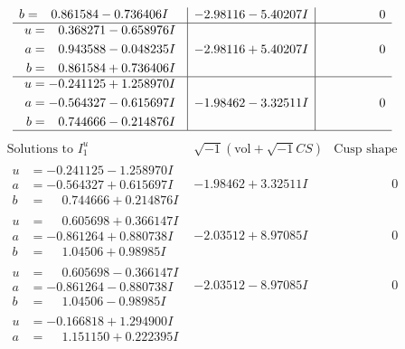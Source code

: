 \documentclass[1p]{elsarticle_modified}
\theoremstyle{definition}
\newcommand{\I}{\sqrt{-1}}
\begin{document}
$$\begin{array}{c|c|c}
\begin{aligned}
b &= \phantom{-}0.861584 - 0.736406 I\end{aligned}
 & -2.98116 - 5.40207 I & \phantom{-0.000000 } 0 \\ \hline\begin{aligned}
u &= \phantom{-}0.368271 - 0.658976 I \\
a &= \phantom{-}0.943588 - 0.048235 I \\
b &= \phantom{-}0.861584 + 0.736406 I\end{aligned}
 & -2.98116 + 5.40207 I & \phantom{-0.000000 } 0 \\ \hline\begin{aligned}
u &= -0.241125 + 1.258970 I \\
a &= -0.564327 - 0.615697 I \\
b &= \phantom{-}0.744666 - 0.214876 I\end{aligned}
 & -1.98462 - 3.32511 I & \phantom{-0.000000 } 0\\
 \hline 
 \end{array}$$\newpage$$\begin{array}{c|c|c}  
\text{Solutions to }I^u_{1}& \I (\text{vol} + \sqrt{-1}CS) & \text{Cusp shape}\\
 \hline 
\begin{aligned}
u &= -0.241125 - 1.258970 I \\
a &= -0.564327 + 0.615697 I \\
b &= \phantom{-}0.744666 + 0.214876 I\end{aligned}
 & -1.98462 + 3.32511 I & \phantom{-0.000000 } 0 \\ \hline\begin{aligned}
u &= \phantom{-}0.605698 + 0.366147 I \\
a &= -0.861264 + 0.880738 I \\
b &= \phantom{-}1.04506 + 0.98985 I\end{aligned}
 & -2.03512 + 8.97085 I & \phantom{-0.000000 } 0 \\ \hline\begin{aligned}
u &= \phantom{-}0.605698 - 0.366147 I \\
a &= -0.861264 - 0.880738 I \\
b &= \phantom{-}1.04506 - 0.98985 I\end{aligned}
 & -2.03512 - 8.97085 I & \phantom{-0.000000 } 0 \\ \hline\begin{aligned}
u &= -0.166818 + 1.294900 I \\
a &= \phantom{-}1.151150 + 0.222395 I \\

\end{aligned}
\end{array}$$
\end{document}
